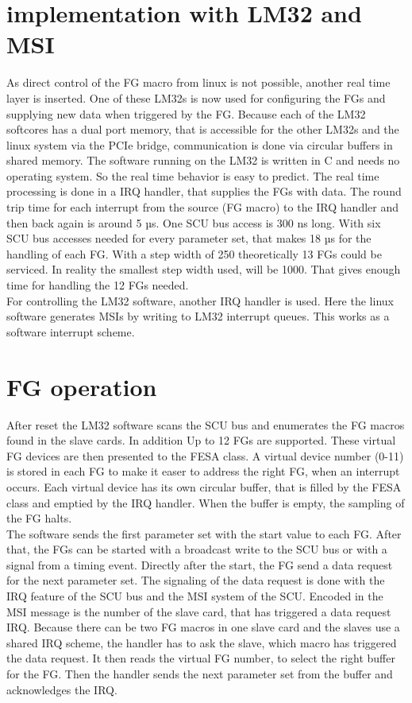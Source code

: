 \documentclass[a4paper,
              ]{jacow}
\begin{document}
\section{implementation with LM32 and MSI}
As direct control of the FG macro from linux is not possible, another real time layer is inserted. 
One of these LM32s is now used for configuring the FGs and supplying new data when triggered by the FG.
Because each of the LM32 softcores has a dual port memory, that is accessible for the other LM32s and the linux system via the PCIe bridge, communication is done via circular buffers in shared memory. The software running on the LM32 is written in C and needs no operating system. So the real time behavior is easy to predict. The real time processing is done in a IRQ handler, that supplies the FGs with data. The round trip time for each interrupt from the source (FG macro) to the IRQ handler and then back again is around 5 µs. One SCU bus access is 300 ns long. With six SCU bus accesses needed for every parameter set, that makes 18 µs for the handling of each FG. With a step width of 250 theoretically 13 FGs could be serviced. In reality the smallest step width used, will be 1000. That gives enough time for handling the 12 FGs needed.\\
For controlling the LM32 software, another IRQ handler is used. Here the linux software generates MSIs by writing to LM32 interrupt queues. This works as a software interrupt scheme.

\section{FG operation}
After reset the LM32 software scans the SCU bus and enumerates the FG macros found in the slave cards. In addition  Up to 12 FGs are supported. These virtual FG devices are then presented to the FESA class. A virtual device number (0-11) is stored in each FG to make it easer to address the right FG, when an interrupt occurs.
Each virtual device has its own circular buffer, that is filled by the FESA class and emptied by the IRQ handler.
When the buffer is empty, the sampling of the FG halts.\\
The software sends the first parameter set with the start value to each FG. After that, the FGs can be started with a broadcast write to the SCU bus or with a signal from a timing event. Directly after the start, the FG send a data request for the next parameter set. The signaling of the data request is done with the IRQ feature of the SCU bus and the MSI system of the SCU. Encoded in the MSI message is the number of the slave card, that has triggered a data request IRQ. Because there can be two FG macros in one slave card and the slaves use a shared IRQ scheme, the handler has to ask the slave, which macro has triggered the data request. It then reads the virtual FG number, to select the right buffer for the FG. Then the handler sends the next parameter set from the buffer and acknowledges the IRQ.
\end{document}
